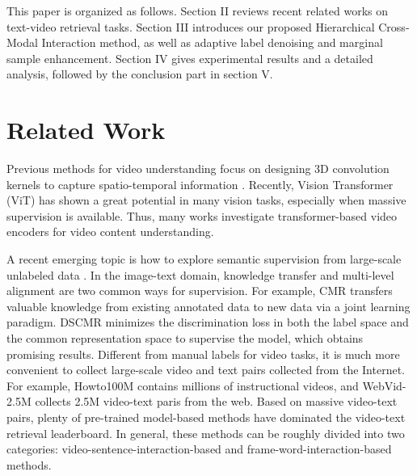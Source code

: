 \documentclass{article}
\begin{document}
This paper is organized as follows.
Section II reviews recent related works on text-video retrieval tasks.
Section III introduces our proposed Hierarchical Cross-Modal Interaction method, as well as adaptive label denoising and marginal sample enhancement.
Section IV gives experimental results and a detailed analysis, followed by the conclusion part in section V.



\section{Related Work}
Previous methods for video understanding focus on designing 3D convolution kernels to capture spatio-temporal information \cite{tran2015learning,xie2018rethinking,feichtenhofer2019slowfast}.
Recently, Vision Transformer (ViT) \cite{dosovitskiy2020image} has shown a great potential in many vision tasks, especially when massive supervision is available.
Thus, many works investigate transformer-based video encoders for video content understanding.

A recent emerging topic is how to explore semantic supervision from large-scale unlabeled data \cite{radford2021learning, miech2020end, radford2021learning}.
In the image-text domain, knowledge transfer and multi-level alignment are two common ways for supervision.
For example, CMR \cite{zhen2020deep} transfers valuable knowledge from existing annotated data to new data via a joint learning paradigm.
DSCMR \cite{zhen2019deep} minimizes the discrimination loss in both the label space and the common representation space to supervise the model, which obtains promising results.
Different from manual labels for video tasks, it is much more convenient to collect large-scale video and text pairs collected from the Internet.
For example, Howto100M \cite{miech2019howto100m} contains millions of instructional videos, and WebVid-2.5M \cite{bain2021frozen} collects 2.5M video-text paris from the web.
Based on massive video-text pairs, plenty of pre-trained model-based methods \cite{luo2020univl, gabeur2020multi,patrick2020support,zhu2020actbert,amrani2021noise,li2020hero,miech2020end,dzabraev2021mdmmt} have dominated the video-text retrieval leaderboard. In general, these methods can be roughly divided into two categories: video-sentence-interaction-based and frame-word-interaction-based methods. 
\end{document}
